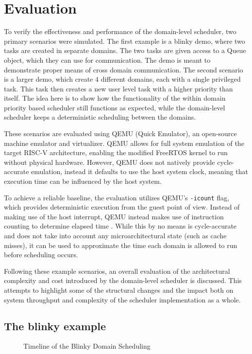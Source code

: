 \section{Evaluation}\label{sec:Evaluation}
To verify the effectiveness and performance of the domain-level scheduler, two
primary scenarios were simulated. The first example is a blinky demo, where two
tasks are created in separate domains. The two tasks are given access to a
Queue object, which they can use for communication. The demo is meant to
demonstrate proper means of cross domain communication. The second scenario is
a larger demo, which create 4 different domains, each with a single privileged
task. This task then creates a new user level task with a higher priority than
itself. The idea here is to show how the functionality of the within domain
priority based scheduler still functions as expected, while the domain-level
scheduler keeps a deterministic scheduling between the domains. 

These scenarios are evaluated using QEMU (Quick Emulator), an open-source
machine emulator and virtualizer. QEMU allows for full system emulation of the
target RISC-V architecture, enabling the modified FreeRTOS kernel to run
without physical hardware. However, QEMU does not natively provide
cycle-accurate emulation, instead it defaults to use the host system clock,
meaning that execution time can be influenced by the host system.

To achieve a reliable baseline, the evaluation utilizes QEMU's \texttt{-icount}
flag, which provides deterministic execution from the guest point of view.
Instead of making use of the host interrupt, QEMU instead makes use of
instruction counting to determine elapsed time \cite{TCGInstructionCounting}.
While this by no means is cycle-accurate and does not take into account any
microarchitectural state (such as cache misses), it can be used to approximate
the time each domain is allowed to run before scheduling occurs.

Following these example scenarios, an overall evaluation of the architectural
complexity and cost introduced by the domain-level scheduler is discussed. This
attempts to highlight some of the structural changes and the impact both on
system throughput and complexity of the scheduler implementation as a whole.

\subsection{The blinky example}
\begin{figure}
  \begin{center}
    
  \end{center}
  \caption{Timeline of the Blinky Domain Scheduling}\label{fig:blinky_timeline}
\end{figure}

